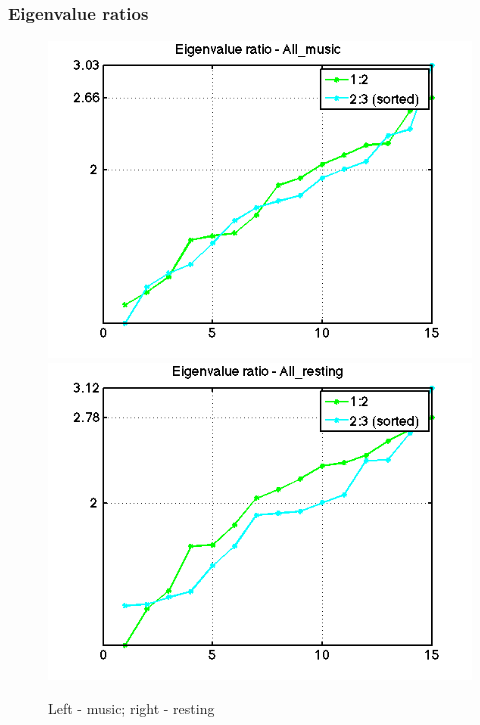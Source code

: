 \documentclass[11pt]{article}
\begin{document}
\subsubsection{Eigenvalue ratios}
\begin{figure}[H]
\includegraphics[width=.49\textwidth]{pictures/041916/evalRatio_All_music.png}
\includegraphics[width=.49\textwidth]{pictures/041916/evalRatio_All_resting.png}
\caption{Left - music; right - resting}
\end{figure}
\end{document}
